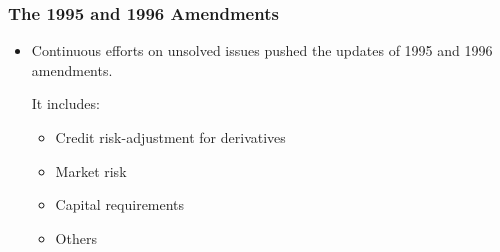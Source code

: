 \subsubsection{The 1995 and 1996 Amendments}
\begin{itemize}
\item Continuous efforts on unsolved issues pushed the updates of 1995 and 1996 amendments.

It includes:
    \begin{itemize}
    \item Credit risk-adjustment for derivatives
    \item Market risk
    \item Capital requirements
    \item Others
    \end{itemize}
    

\end{itemize}



